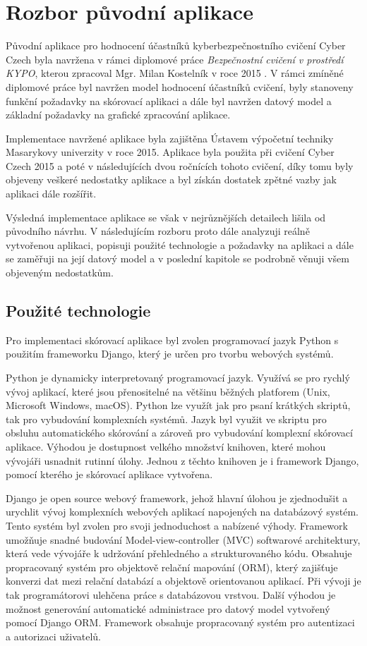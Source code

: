 \documentclass[
  digital,
  twoside,
  table, 
  nolof, 
  nolot
]{fithesis3}
\begin{document}
\chapter{Rozbor původní aplikace}
\label{oldApp}

Původní aplikace pro hodnocení účastníků kyberbezpečnostního cvičení Cyber Czech byla navržena v rámci diplomové práce \emph{Bezpečnostní cvičení v prostředí KYPO}, kterou zpracoval Mgr. Milan Kostelník v roce 2015 \cite{Kostelnik2016thesis}. V rámci zmíněné diplomové práce byl navržen model hodnocení účastníků cvičení, byly stanoveny funkční požadavky na skórovací aplikaci a dále byl navržen datový model a základní požadavky na grafické zpracování aplikace. 

Implementace navržené aplikace byla zajištěna Ústavem výpočetní techniky Masarykovy univerzity v roce 2015. Aplikace byla použita při cvičení Cyber Czech 2015 a poté v následujících dvou ročnících tohoto cvičení, díky tomu byly objeveny veškeré nedostatky aplikace a byl získán dostatek zpětné vazby jak aplikaci dále rozšířit.

Výsledná implementace aplikace se však v nejrůznějších detailech lišila od původního návrhu. V následujícím rozboru proto dále analyzuji reálně vytvořenou aplikaci, popisuji použité technologie a požadavky na aplikaci a dále se zaměřuji na její datový model a v poslední kapitole se podrobně věnuji všem objeveným nedostatkům.

\section{Použité technologie}
Pro implementaci skórovací aplikace byl zvolen programovací jazyk Python s použitím frameworku Django, který je určen pro tvorbu webových systémů. 

Python je dynamicky interpretovaný programovací jazyk. Využívá se pro rychlý vývoj aplikací, které jsou přenositelné na většinu běžných platforem (Unix, Microsoft Windows, macOS). Python lze využít jak pro psaní krátkých skriptů, tak pro vybudování komplexních systémů. Jazyk byl využit ve skriptu pro obsluhu automatického skórování a zároveň pro vybudování komplexní skórovací aplikace. Výhodou je dostupnost velkého množství knihoven, které mohou vývojáři usnadnit rutinní úlohy. Jednou z těchto knihoven je i framework Django, pomocí kterého je skórovací aplikace vytvořena.

Django je open source webový framework, jehož hlavní úlohou je zjednodušit a urychlit vývoj komplexních webových aplikací napojených na databázový systém. Tento systém byl zvolen pro svoji jednoduchost a nabízené výhody. Framework umožňuje snadné budování Model-view-controller (MVC) softwarové architektury, která vede vývojáře k udržování přehledného a strukturovaného kódu. Obsahuje propracovaný systém pro objektově relační mapování (ORM), který zajišťuje konverzi dat mezi relační databází a objektově orientovanou aplikací. Při vývoji je tak programátorovi ulehčena práce s databázovou vrstvou. Další výhodou je možnost generování automatické administrace pro datový model vytvořený pomocí Django ORM. Framework obsahuje propracovaný systém pro autentizaci a autorizaci uživatelů. 
\end{document}
